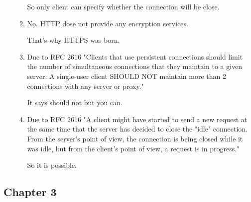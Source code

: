 \begin{enumerate}
\begin{enumerate}
        So only client can specify whether the connection will be close.
        
        \item No. HTTP dose not provide any encryption services.
        
        That's why HTTPS was born.
        
        \item Due to RFC 2616 "Clients that use persistent connections should limit the number of simultaneous connections that they maintain to a given server. A single-user client SHOULD NOT maintain more than 2 connections with any server or proxy."
        
        It says should not but you can.
        
        \item Due to RFC 2616 "A client might have started to send a new request at the same time that the server has decided to close the "idle" connection. From the server's point of view, the connection is being closed while it was idle, but from the client's point of view, a request is in progress."
        
        So it is possible.
        
    \end{enumerate}
    
\end{enumerate}
    

\subsection{Chapter 3}


